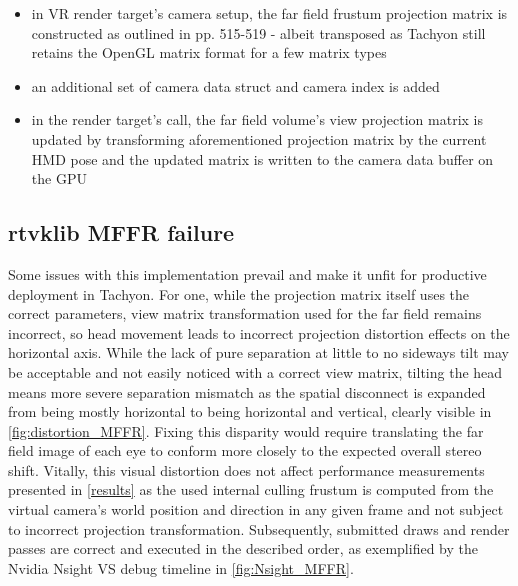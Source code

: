 \begin{itemize}
\item in \gls{VR} render target's camera setup, the far field frustum projection matrix is constructed as outlined in \cite{Lapinski.2017} pp. 515-519 - albeit transposed as \gls{Tachyon} still retains the OpenGL matrix format for a few matrix types
\item an additional set of camera data struct and camera index is added
\item in the render target's  call, the far field volume's view projection matrix is updated by transforming aforementioned projection matrix by the current \gls{HMD} pose and the updated matrix is written to the camera data buffer on the GPU
\end{itemize}

\subsection{\gls{rtvklib} \gls{MFFR} failure} \label{MFFR_failure}
Some issues with this implementation prevail and make it unfit for productive deployment in \gls{Tachyon}. For one, while the projection matrix itself uses the correct parameters, view matrix transformation used for the far field remains incorrect, so head movement leads to incorrect projection distortion effects on the horizontal axis. While the lack of pure separation at little to no sideways tilt may be acceptable and not easily noticed with a correct view matrix, tilting the head means more severe separation mismatch as the spatial disconnect is expanded from being mostly horizontal to being horizontal and vertical, clearly visible in \autoref{fig:distortion_MFFR}. Fixing this disparity would require translating the far field image of each eye to conform more closely to the expected overall stereo shift. 
Vitally, this visual distortion does not affect performance measurements presented in \autoref{results} as the used internal culling frustum is computed from the virtual camera's world position and direction in any given frame and not subject to incorrect projection transformation. Subsequently, submitted draws and render passes are correct and executed in the described order, as exemplified by the Nvidia \gls{Nsight VS} debug timeline in \autoref{fig:Nsight_MFFR}. 

